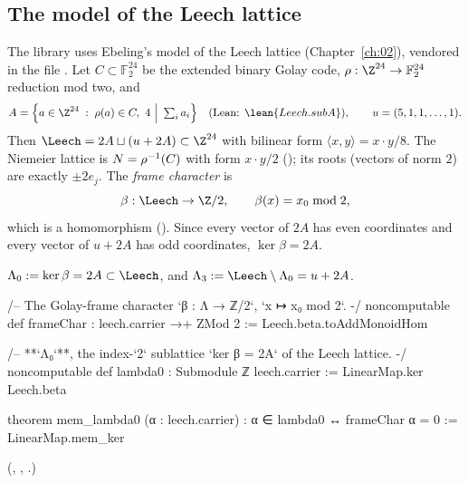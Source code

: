 \subsection{The model of the Leech lattice}

The library uses Ebeling's model of the Leech lattice (Chapter~\ref{ch:02}), vendored in the file
.  Let $C\subset\mathbb F_2^{24}$ be the extended
binary Golay code, $\rho:\Z^{24}\to\mathbb F_2^{24}$ reduction mod two, and
\begin{equation*}
  A=\Big\{a\in\Z^{24}\;:\;\rho(a)\in C,\ 4\ \Big|\ \textstyle\sum_i a_i\Big\}
  \quad(\text{Lean: }\lean{Leech.subA}),\qquad u=(5,1,1,\dots,1).
\end{equation*}
Then $\Leech=2A\sqcup(u+2A)\subset\Z^{24}$ with bilinear form $\langle x,y\rangle=x\cdot y/8$.
The Niemeier lattice is $N=\rho^{-1}(C)$ with form $x\cdot y/2$ (); its
roots (vectors of norm $2$) are exactly $\pm2e_j$.  The \emph{frame character} is
\begin{equation*}
  \beta:\Leech\to\Z/2,\qquad \beta(x)=x_0\bmod 2 ,
\end{equation*}
which is a homomorphism ().  Since every vector of $2A$ has even coordinates and
every vector of $u+2A$ has odd coordinates, $\ker\beta=2A$.

\begin{definition}\label{ch11:def:lambda0}
$\Lambda_0:=\ker\beta=2A\subset\Leech$, and $\Lambda_3:=\Leech\setminus\Lambda_0=u+2A$.
\end{definition}

\begin{leancode}
/-- The Golay-frame character `β : Λ → ℤ/2`, `x ↦ x₀ mod 2`. -/
noncomputable def frameChar : leech.carrier →+ ZMod 2 := Leech.beta.toAddMonoidHom

/-- **`Λ₀`**, the index-`2` sublattice `ker β = 2A` of the Leech lattice. -/
noncomputable def lambda0 : Submodule ℤ leech.carrier := LinearMap.ker Leech.beta

theorem mem_lambda0 (α : leech.carrier) : α ∈ lambda0 ↔ frameChar α = 0 := LinearMap.mem_ker
\end{leancode}
(, ,
.)

